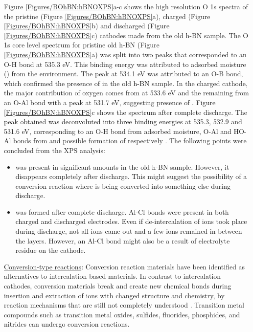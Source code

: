 Figure \ref{Figures/BOhBN:hBNOXPS}a-c shows the high resolution O 1s spectra of the pristine (Figure \ref{Figures/BOhBN:hBNOXPS}a), charged (Figure \ref{Figures/BOhBN:hBNOXPS}b) and discharged (Figure \ref{Figures/BOhBN:hBNOXPS}c) cathodes made from the old h-BN sample. The O 1s core level spectrum for pristine old h-BN (Figure \ref{Figures/BOhBN:hBNOXPS}a) was split into two peaks that corresponded to an O-H bond at 535.3 eV. This binding energy was attributed to adsorbed moisture () from the environment. The peak at 534.1 eV was attributed to an O-B bond, which confirmed the presence of  in the old h-BN sample. In the charged cathode, the major contribution of oxygen comes from  at 533.6 eV and the remaining from an O-Al bond with a peak at 531.7 eV, suggesting presence of .  Figure \ref{Figures/BOhBN:hBNOXPS}c shows the spectrum after complete discharge. The peak obtained was deconvoluted into three binding energies at 535.3, 532.9 and 531.6 eV, corresponding to an O-H bond from adsorbed moisture, O-Al and HO-Al bonds from  and possible formation of  respectively \cite{}. The following points were concluded from the XPS analysis:
\begin{itemize}
    \item {} was present in significant amounts in the old h-BN sample. However, it disappears completely after discharge. This might suggest the possibility of a conversion reaction where  is being converted into something else during discharge.  
    \item {} was formed after complete discharge. Al-Cl bonds were present in both charged and discharged electrodes. Even if de-intercalation of ions took place during discharge, not all ions came out and a few  ions remained in between the layers. However, an Al-Cl bond might also be a result of electrolyte residue on the cathode. 
\end{itemize}

\underline{Conversion-type reactions}: Conversion reaction materials have been identified as alternatives to intercalation-based materials. In contrast to intercalation cathodes, conversion materials break and create new chemical bonds during insertion and extraction of ions with changed structure and chemistry, by reaction mechanisms that are still not completely understood \cite{wu_conversion_2017}. Transition metal compounds such as transition metal oxides, sulfides, fluorides, phosphides, and nitrides can undergo conversion reactions.

